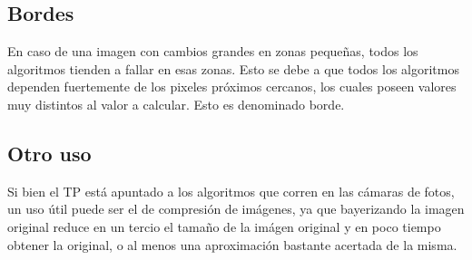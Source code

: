 

\subsection{Bordes}
En caso de una imagen con cambios grandes en zonas pequeñas, todos los algoritmos tienden a fallar en esas zonas.
Esto se debe a que todos los algoritmos dependen fuertemente de los pixeles próximos cercanos, los cuales poseen valores muy distintos al valor a calcular. Esto es denominado borde.

\subsection{Otro uso}
Si bien el TP está apuntado a los algoritmos que corren en las cámaras de fotos, un uso útil puede ser el de compresión de imágenes, ya que bayerizando la imagen original reduce en un tercio el tamaño de la imágen original y en poco tiempo obtener la original, o al menos una aproximación bastante acertada de la misma.